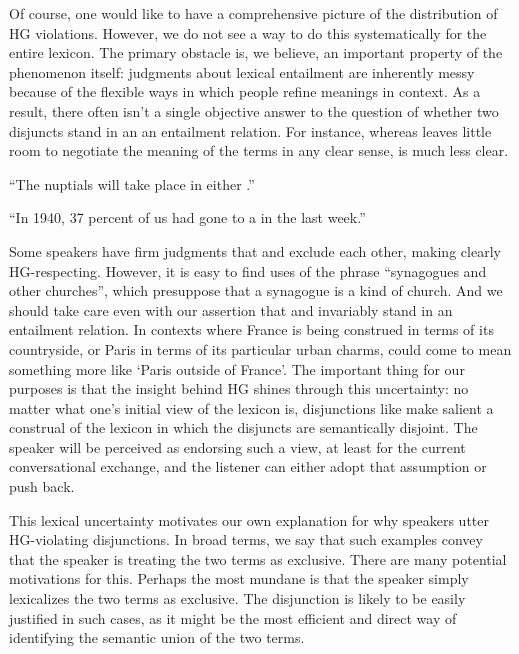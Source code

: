 \documentclass{article}
\begin{document}
Of course, one would like to have a comprehensive picture of the
distribution of HG violations. However, we do not see a way to do this
systematically for the entire lexicon. The primary obstacle is, we
believe, an important property of the phenomenon itself: judgments
about lexical entailment are inherently messy because of the flexible
ways in which people refine meanings in context. As a result, there
often isn't a single objective answer to the question of whether two
disjuncts stand in an an entailment relation. For instance, whereas
 leaves little room to negotiate the
meaning of the terms in any clear sense,
 is much less clear.
%
\begin{examples}
\item\label{exclusive}
  \begin{examples}
  \item\label{franceorparis} ``The nuptials will take place in either
    .''
  \item\label{churchorsynagogue} ``In 1940, 37 percent of us had gone
    to a  in the last week.''
  \end{examples}
\end{examples}
%
Some speakers have firm judgments that  and
 exclude each other, making
 clearly HG-respecting. However,
it is easy to find uses of the phrase ``synagogues and other
churches'', which presuppose that a synagogue is a kind of church. And
we should take care even with our assertion that  and
 invariably stand in an entailment relation. In contexts
where France is being construed in terms of its countryside, or Paris
in terms of its particular urban charms,  could come to
mean something more like `Paris outside of France'. The important
thing for our purposes is that the insight behind HG shines through
this uncertainty: no matter what one's initial view of the lexicon is,
disjunctions like  make salient a construal of the
lexicon in which the disjuncts are semantically disjoint. The speaker
will be perceived as endorsing such a view, at least for the current
conversational exchange, and the listener can either adopt that
assumption or push back.

This lexical uncertainty motivates our own explanation for why
speakers utter HG-violating disjunctions. In broad terms, we say that
such examples convey that the speaker is treating the two terms as
exclusive. There are many potential motivations for this. Perhaps the
most mundane is that the speaker simply lexicalizes the two terms as
exclusive. The disjunction is likely to be easily justified in such
cases, as it might be the most efficient and direct way of identifying
the semantic union of the two terms.
\end{document}
